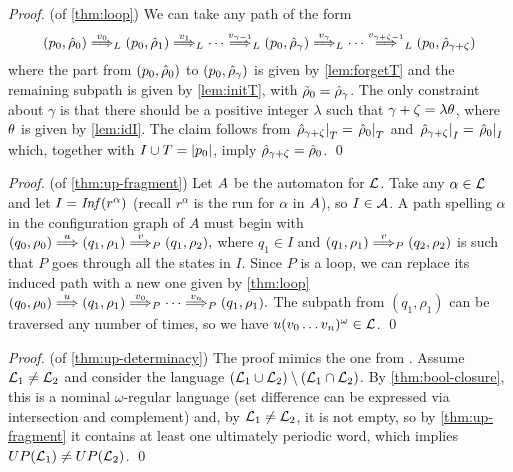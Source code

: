 \begin{proof}(of \autoref{thm:loop})
We can take any path of the form
\[
	(p_0,\hat{\rho}_0) \overset{v_0}{\Longrightarrow}_{L} (p_0,\hat{\rho}_1) \overset{v_1}{\Longrightarrow}_{L} \cdots \overset{v_{\gamma-1}}{\Longrightarrow}_{L} (p_0,\hat{\rho}_\gamma) \overset{v_{\gamma}}{\Longrightarrow}_{L} \cdots \overset{v_{\gamma + \zeta - 1}}{\Longrightarrow}_{L} (p_0,\hat{\rho}_{\gamma + 
	 \zeta})
\]
where the part from $(p_0,\hat{\rho}_0)$ to $(p_0,\hat{\rho}_\gamma)$ is given by \cref{lem:forgetT} and the remaining subpath is given by \cref{lem:initT}, with $\tilde{\rho}_0 = \hat{\rho}_\gamma$. The only constraint about $\gamma$ is that there should be a positive integer $\lambda$ such that $\gamma + \zeta = \lambda \theta$, where $\theta$ is given by \cref{lem:idI}. The claim follows from $\left.\hat{\rho}_{\gamma + \zeta}\right|_{T} = \left.\hat{\rho}_0\right|_{T}$ and 
$\left.\hat{\rho}_{\gamma + \zeta}\right|_{I} = \left.\hat{\rho}_0\right|_{I}$ which, together with $I \cup T = |p_0|$, imply $\hat{\rho}_{\gamma + \zeta} = \hat{\rho}_0$.
\qed
\end{proof}

\begin{proof}(of \autoref{thm:up-fragment})
Let $A$ be the automaton for $\mathcal{L}$. Take any $\alpha \in \mathcal{L}$ and let $I = \mathit{Inf}(r^\alpha)$ (recall $r^\alpha$ is the run for $\alpha$ in $A$), so $I \in \mathcal{A}$. A path spelling $\alpha$ in the configuration graph of $A$ must begin with
$
	(q_0,\rho_0) \overset{u}{\Longrightarrow} (q_1,\rho_1) \overset{v}{\Longrightarrow}_{P} (q_1,\rho_2),
$
where $q_1 \in I$ and $(q_1,\rho_1) \overset{v}{\Longrightarrow}_{P} (q_2,\rho_2)$ is such that $P$ goes through all the states in $I$. Since $P$ is a loop, we can replace its induced path with a new one given by \cref{thm:loop} 
$
	(q_0,\rho_0) \overset{u}{\Longrightarrow} (q_1,\rho_1) \overset{v_0}{\Longrightarrow}_{P} \cdots \overset{v_n}{\Longrightarrow}_{P} (q_1,\rho_1).
$
The subpath from $(q_1,\rho_1)$ can be traversed any number of times, so we have $u(v_0\dots v_n)^\omega \in \mathcal{L}$.
\qed
\end{proof}

\begin{proof}(of \autoref{thm:up-determinacy})
The proof mimics the one from \cite{CalbrixNP93}. Assume $\mathcal{L}_1 \neq \mathcal{L}_2$ and consider the language $(\mathcal{L}_1 \cup \mathcal{L}_2) \setminus (\mathcal{L}_1 \cap \mathcal{L}_2)$. By \cref{thm:bool-closure}, this is a nominal $\omega$-regular language (set difference can be expressed via intersection and complement)  and, by $\mathcal{L}_1 \neq \mathcal{L}_2$, it is not empty, so by \cref{thm:up-fragment} it contains at least one ultimately periodic word, which implies $UP(\mathcal{L}_1) \neq UP(\mathcal{L}_2)$. \qed
\end{proof}
